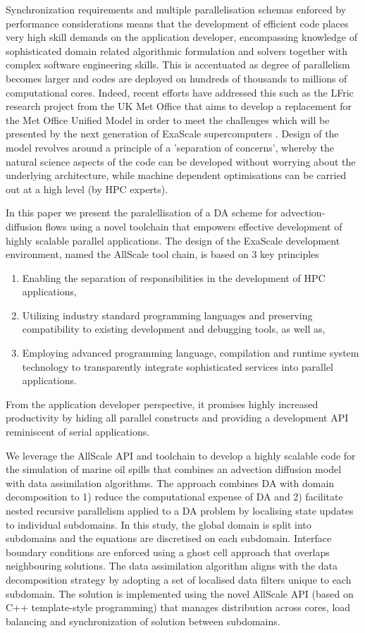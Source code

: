 \documentclass[conference,compsoc]{IEEEtran}
\begin{document}
Synchronization requirements and multiple parallelisation schemas enforced by performance considerations means that the development of efficient code places very high skill demands on the application developer, encompassing knowledge of sophisticated domain related algorithmic formulation and solvers together with complex software engineering skills. This is accentuated as degree of parallelism becomes larger and codes are deployed on hundreds of thousands to millions of computational cores. Indeed, recent efforts have addressed this such as the LFric research project from the UK Met Office that aims to develop a replacement for the Met Office Unified Model in order to meet the challenges which will be presented by the next generation of ExaScale supercomputers \cite{melvin2017lfric}. Design of the model revolves around a principle of a 'separation of concerns', whereby the natural science aspects of the code can be developed without worrying about the underlying architecture, while machine dependent optimisations can be carried out at a high level (by HPC experts).

In this paper we present the paralellisation of a DA scheme for advection-diffusion flows using a novel toolchain that empowers effective development of highly scalable parallel applications. The design of the ExaScale development environment, named the AllScale tool chain, is based on 3 key principles
\begin{enumerate}
\item Enabling the separation of responsibilities in the development of HPC applications,
\item Utilizing industry standard programming languages and preserving compatibility to existing development and debugging tools, as well as,
\item Employing advanced programming language, compilation and runtime system technology to transparently integrate sophisticated services into parallel applications.
\end{enumerate} 
From the application developer perspective, it promises highly increased productivity by hiding all parallel constructs and providing a development API reminiscent of serial applications.

We leverage the AllScale API and toolchain to develop a highly scalable code for the simulation of marine oil spills that combines an advection diffusion model with data assimilation algorithms. The approach combines DA with domain decomposition to 1) reduce the computational expense of DA and 2) facilitate nested recursive parallelism applied to a DA problem by localising state updates to individual subdomains. 
In this study, the global domain is split into subdomains and the equations are discretised on each subdomain. Interface boundary conditions are enforced using a ghost cell approach that overlaps neighbouring solutions. The data assimilation algorithm aligns with the data decomposition strategy by adopting a set of localised data filters unique to each subdomain. The solution is implemented using the novel AllScale API (based on C++ template-style programming) that manages distribution across cores, load balancing and synchronization of solution between subdomains. 
\end{document}
